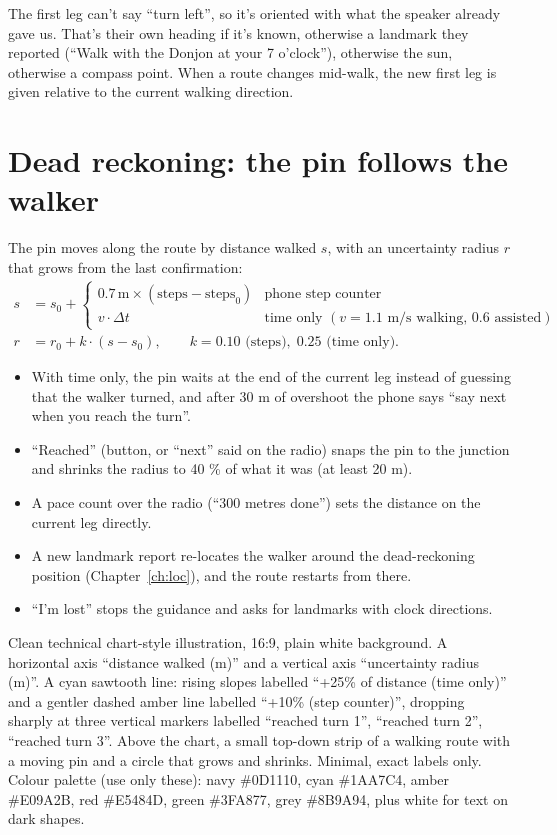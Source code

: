 The first leg can't say ``turn left'', so it's oriented with what the speaker already gave us. That's their own
heading if it's known, otherwise a landmark they reported (``Walk with the Donjon at your 7 o'clock''), otherwise
the sun, otherwise a compass point. When a route changes mid-walk, the new first leg is given relative to the
current walking direction.

\section{Dead reckoning: the pin follows the walker}

The pin moves along the route by distance walked $s$, with an uncertainty radius $r$ that grows from the last
confirmation:
\begin{align}
  s &= s_0 + \begin{cases} 0.7\,\text{m} \times (\text{steps} - \text{steps}_0) & \text{phone step counter}\\
                            v \cdot \Delta t & \text{time only } (v = 1.1 \text{ m/s walking, } 0.6 \text{ assisted})\end{cases}\\
  r &= r_0 + k \cdot (s - s_0), \qquad k = 0.10 \text{ (steps)},\; 0.25 \text{ (time only)}.
\end{align}
\begin{itemize}
  \item With time only, the pin waits at the end of the current leg instead of guessing that the walker turned,
        and after 30 m of overshoot the phone says ``say next when you reach the turn''.
  \item ``Reached'' (button, or ``next'' said on the radio) snaps the pin to the junction and shrinks the radius to
        40 \% of what it was (at least 20 m).
  \item A pace count over the radio (``300 metres done'') sets the distance on the current leg directly.
  \item A new landmark report re-locates the walker around the dead-reckoning position (Chapter~\ref{ch:loc}), and the
        route restarts from there.
  \item ``I'm lost'' stops the guidance and asks for landmarks with clock directions.
\end{itemize}

{Clean technical chart-style illustration, 16:9, plain white background. A horizontal axis ``distance walked (m)'' and a vertical
axis ``uncertainty radius (m)''. A cyan sawtooth line: rising slopes labelled ``+25\% of distance (time only)'' and a gentler
dashed amber line labelled ``+10\% (step counter)'', dropping sharply at three vertical markers labelled ``reached turn 1'',
``reached turn 2'', ``reached turn 3''. Above the chart, a small top-down strip of a walking route with a moving pin and a circle
that grows and shrinks. Minimal, exact labels only. Colour palette (use only these): navy \#0D1110, cyan \#1AA7C4, amber \#E09A2B, red \#E5484D, green \#3FA877, grey \#8B9A94, plus white for text on dark shapes.}

